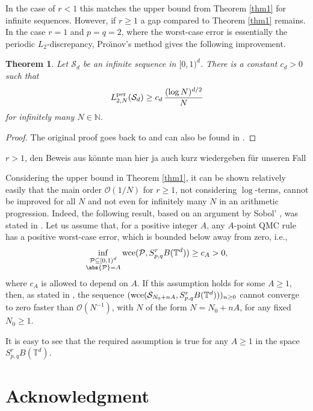 \documentclass[12pt, a4paper]{article}
\newtheorem{thm}{Theorem}
\def\P{\mathcal{P}}
\def\S{\mathcal{S}}
\newcommand{\wce}{{\rm wce}}
\newcommand{\nicolas}[1]{\begingroup\color{teal}#1\endgroup}
\newcommand{\peter}[1]{\begingroup\color{violet}#1\endgroup}
\newcommand{\bbT}{{\mathbb{T}}}
\newcommand{\bbN}{{\mathbb{N}}}
\begin{document}
In the case of $r<1$ this matches the upper bound from Theorem \ref{thm1} for infinite sequences. However, if $r \geq 1$ a gap compared to Theorem \ref{thm1} remains. In the case $r=1$ and $p=q=2$, where the worst-case error is essentially the periodic $L_2$-discrepancy, Pro{\u\i}nov's method gives the following improvement.

\begin{thm}
    Let $\S_d$ be an infinite sequence in $[0, 1)^d$. There is a constant $c_d > 0$ such that
    $$
    L_{2,N}^{{\rm per}}(\S_d) \ge c_d \, \frac{(\log N)^{d/2}}{N}
    $$
    for infinitely many $N \in \bbN$.
\end{thm}
\begin{proof}
    The original proof goes back to \cite{pro2000, pro1988a} and can also be found in \cite{kirk}.
\end{proof}

\nicolas{$r > 1$, den Beweis aus \cite{HKKN12} k\"onnte man hier ja auch kurz wiedergeben f\"ur unseren Fall}

\peter{Considering the upper bound in Theorem \ref{thm1},
it can be shown relatively easily that the main order $\mathcal{O}(1/N)$ for $r\ge 1$, not considering $\log$-terms, cannot be improved 
for all $N$ and not even for infinitely many $N$ in an arithmetic progression. Indeed, the following result, based on an argument by Sobol' \cite{S98}, was stated in \cite{HKKN12}. Let us assume that, for a positive integer $A$,  any $A$-point QMC rule has a positive worst-case error, which is bounded below away from zero, i.e.,
\begin{equation}\label{eq:assump_Sobol}
    \inf_{\substack{\P \subseteq [0,1)^d\\ \abs{\P}=A}}  \wce(\P, S^r_{p, q}B(\bbT^d)) \ge c_A > 0,
\end{equation}
where $c_A$ is allowed to depend on $A$. 
If this assumption holds for some $A\ge 1$,
then, as stated in \cite[Proposition 1]{HKKN12}, the sequence 
$(\wce(\S_{N_0+nA}, S^r_{p, q}B(\bbT^d)))_{n\ge 0}$
cannot converge to zero faster than $\mathcal{O}(N^{-1})$, with $N$ of the form $N = N_0 + nA$, for any fixed $N_0 \ge 1$. 

It is easy to see that the required assumption is true for any $A\ge 1$ in the space $S^r_{p, q}B(\bbT^d)$.
}
\fi

\section*{Acknowledgment}
\end{document}
